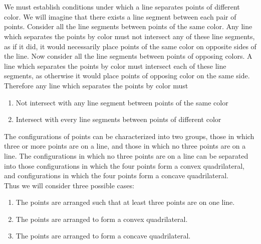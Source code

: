 \documentclass[11pt]{article}
\begin{document}
\section{}
We must establish conditions under which a line separates points of different color. We will imagine that there exists a line segment between each pair of points. 
Consider all the line segments between points of the same color. Any line which separates the points by color must not intersect any of these line segments, as if it did, it would necessarily place points of the same color on opposite sides of the line. Now consider all the line segments between points of opposing colors. A line which separates the points by color must intersect each of these line segments, as otherwise it would place points of opposing color on the same side. Therefore any line which separates the points by color must
\begin{enumerate}
    \item Not intersect with any line segment between points of the same color
    \item Intersect with every line segments between points of different color
\end{enumerate}

The configurations of points can be characterized into two groups, those in which three or more points are on a line, and those in which no three points are on a line.
The configurations in which no three points are on a line can be separated into those configurations in which the four points form a convex quadrilateral, and configurations in which the four points form a concave quadrilateral. \\ 
Thus we will consider three possible cases: 
\begin{enumerate}
    \item The points are arranged such that at least three points are on one line. 
    \item The points are arranged to form a convex quadrilateral. 
    \item The points are arranged to form a concave quadrilateral.  
\end{enumerate}
\end{document}
